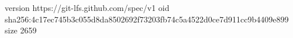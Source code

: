 version https://git-lfs.github.com/spec/v1
oid sha256:4c17ec745b3c055d8da8502692f73203fb74c5a4522d0ce7d911cc9b4409e899
size 2659
